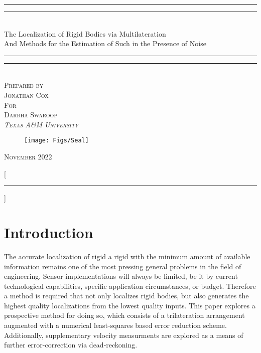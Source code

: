 \documentclass{report}
\begin{document}
	\begin{titlepage}
		\centering
		
		\rule{\textwidth}{1.6pt}\vspace*{-\baselineskip}\vspace*{2pt}
		\rule{\textwidth}{0.4pt}\\[\baselineskip]
		{\huge The Localization of Rigid Bodies via Multilateration}\\
		{\Large And Methods for the Estimation of Such in the Presence of Noise}\\
		\rule{\textwidth}{0.4pt}\vspace*{-\baselineskip}\vspace{3.2pt}
		\rule{\textwidth}{1.6pt}\\[\baselineskip]
		\scshape
		\vspace*{1\baselineskip}
		{\large Prepared by}\\[0.8\baselineskip]
		{\Large Jonathan Cox}\\[2\baselineskip]
		{\large For} \\[0.8\baselineskip]
		{\Large Darbha Swaroop}\\
		{\itshape Texas A\&M University}\\
		
		\vspace*{1.5\baselineskip}

		\begin{figure}[H]
			\centering
			\texttt{[image: Figs/Seal]}
		\end{figure}
		\vfill
		{\scshape November 2022} \\
	\end{titlepage}

\newpage



\renewcommand{\thechapter}{}
\titleformat{\chapter}[display]{\bfseries\Huge}{\vspace{-\baselineskip}}{0.0ex}{}[\rule{\textwidth}{3pt}]

	\chapter*{Introduction}
		The accurate localization of rigid a rigid with the minimum amount of available information remains one of the most pressing general problems in the field of engineering. Sensor implementations will always be limited, be it by current technological capabilities, specific application circumstances, or budget. Therefore a method is required that not only localizes rigid bodies, but also generates the highest quality localizations from the lowest quality inputs. This paper explores a prospective method for doing so, which consists of a trilateration arrangement augmented with a numerical least-squares based error reduction scheme. Additionally, supplementary velocity measurments are explored as a means of further error-correction via dead-reckoning.
\end{document}
